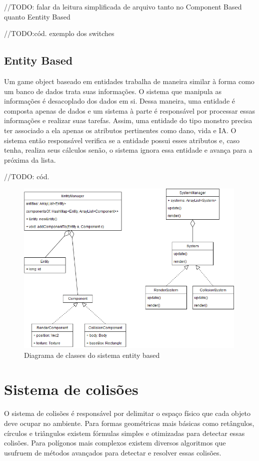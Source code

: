 \documentclass[12pt, 
openright, 
oneside, 
a4paper,    
brazil]{facom-ufu-abntex2}
\begin{document}
//TODO: falar da leitura simplificada de arquivo tanto no Component Based quanto Eentity Based

//TODO:cód. exemplo dos switches


\subsection{Entity Based}
Um game object baseado em entidades trabalha de maneira similar à forma como um banco de dados trata suas informações. O sistema que manipula as informações é desacoplado dos dados em si. Dessa maneira, uma entidade é composta apenas de dados e um sistema à parte é responsável por processar essas informações e realizar suas tarefas.
Assim, uma entidade do tipo monstro precisa ter associado a ela apenas os atributos pertinentes como dano, vida e IA. O sistema então responsável verifica se a entidade possui esses atributos e, caso tenha, realiza seus cálculos senão, o sistema ignora essa entidade e avança para a próxima da lista.

//TODO: cód.

\begin{figure}[H]
	\centering
	\includegraphics[width=30em]{imagens/entityDiagram.png}
	\caption{Diagrama de classes do sistema entity based}
\end{figure}

\section{Sistema de colisões}

O sistema de colisões é responsável por delimitar o espaço físico que cada objeto deve ocupar no ambiente. Para formas geométricas mais básicas como retângulos, círculos e triângulos existem fórmulas simples e otimizadas para detectar essas colisões. Para polígonos mais complexos existem diversos algoritmos que usufruem de métodos avançados para detectar e resolver essas colisões.
\end{document}
